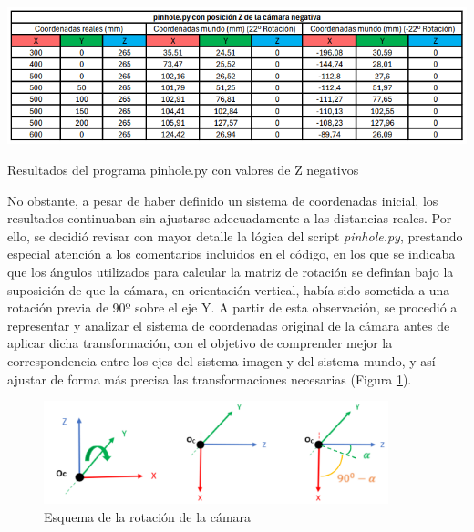   
  \begin{table}[H]
   \centering
   \begin{center}
     \includegraphics[width=150mm]{figs/pinhole con Z negativa.png}
   \end{center}
   \caption{Resultados del programa pinhole.py con valores de Z negativos}
   \label{tab:pinhole_Zneg}
  \end{table}

No obstante, a pesar de haber definido un sistema de coordenadas inicial, los resultados continuaban sin ajustarse adecuadamente a las distancias reales. Por ello, se decidió revisar con mayor detalle la lógica del script \textit{pinhole.py}, prestando especial atención a los comentarios incluidos en el código, en los que se indicaba que los ángulos utilizados para calcular la matriz de rotación se definían bajo la suposición de que la cámara, en orientación vertical, había sido sometida a una rotación previa de 90º sobre el eje Y. A partir de esta observación, se procedió a representar y analizar el sistema de coordenadas original de la cámara antes de aplicar dicha transformación, con el objetivo de comprender mejor la correspondencia entre los ejes del sistema imagen y del sistema mundo, y así ajustar de forma más precisa las transformaciones necesarias (Figura \ref{fig:esquema_rot_camara}). 

  \begin{figure}[H]
     \centering
     \begin{center}
       \includegraphics[width=100mm]{figs/Esquema rotación cámara.png}
     \end{center}
     \caption{Esquema de la rotación de la cámara}
    \label{fig:esquema_rot_camara}
  \end{figure}

